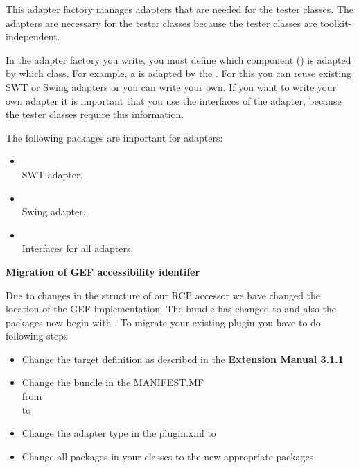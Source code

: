 This adapter factory manages adapters that are needed for the tester classes. The adapters are necessary for the tester classes because the tester classes are toolkit-independent.

In the adapter factory you write, you must define which component () is adapted by which class. For example, a  is adapted by the . For this you can reuse existing SWT or Swing adapters or you can write your own. If you want to write your own adapter it is important that you use the \app{} interfaces of the adapter, because the tester classes require this information.  

The following packages are important for adapters:
\begin{itemize}
\item {}\\ SWT adapter.
\item {}\\ Swing adapter.
\item {}\\Interfaces for all adapters.
\end{itemize}

\textbf{Migration of GEF accessibility identifer}

Due to changes in the structure of our RCP accessor we have changed the location of the GEF implementation. The bundle has changed to  and also the packages now begin with . To migrate your existing plugin you have to do following steps
\begin{itemize}
\item Change the target definition as described in the \textbf{Extension Manual 3.1.1}
\item Change the bundle in the MANIFEST.MF\\ from \\ to 
\item Change the adapter type in the plugin.xml to \\ 
\item Change all packages in your classes to the new appropriate packages
\end{itemize}


